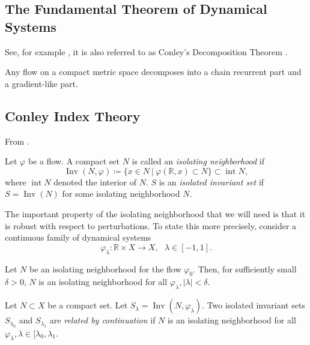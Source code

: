 \documentclass{article}
\newcommand{\reals}{\mathbb{R}}
\newcommand{\inv}{\operatorname{Inv}}
\newcounter{ct}
\begin{document}
\subsection{The Fundamental Theorem of Dynamical Systems}\label{sec:fundamental}
See, for example \citep{conley1978morse, norton1995fundamental}, it is also referred to as Conley's Decomposition Theorem  \citep{mischaikow1999cit}.

\begin{theorem}
 Any flow on a compact metric space decomposes into a chain recurrent part and a gradient-like part.
\end{theorem}



\subsection{Conley Index Theory}\label{sec:cit}
From \citet{mischaikow1999cit}.

Let $\varphi$ be a flow. A compact set $N$ is called an \emph{isolating neighborhood} if 
\[
\inv(N,\varphi) \coloneqq \{x\in N\ | \ \varphi(\reals,x)\subset N\} \subset \operatorname{int} N,
\]
where $ \operatorname{int} N$ denoted the interior of $N$. 
$S$ is an \emph{isolated invariant set} if $S=\inv(N)$ for some isolating neighborhood $N$.

The important property of the isolating neighborhood that we will need is that it is robust with respect to perturbations. To state this more precisely, consider a continuous family of dynamical systems
\begin{equation}
\varphi_\lambda\colon \reals\times X\rightarrow X, \ \ \ \lambda\in[-1,1].
\end{equation}

\begin{proposition}
Let $N$ be an isolating neighborhood for the flow $\varphi_0$. Then, for sufficiently small $\delta>0$, $N$ is an isolating neighborhood for all $\varphi_\lambda, |\lambda|<\delta$.
\end{proposition}

\begin{definition}
Let $N\subset X$ be a compact set. 
Let $S_\lambda = \inv(N,\varphi_\lambda).$
Two isolated invariant sets $S_{\lambda_0}$ and $S_{\lambda_1}$ are \emph{related by continuation} if $N$ is an isolating neighborhood for all $\varphi_\lambda, \lambda\in[\lambda_0,\lambda_1$.
\end{definition}
\end{document}
